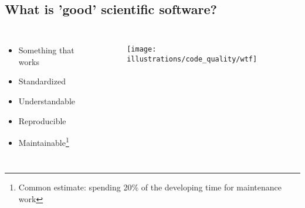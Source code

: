 \documentclass[usenames,dvipsnames]{beamer}
\theoremstyle{plain}
\theoremstyle{definition}
\begin{document}
\begin{frame}{\setframetitle{}}
{
        \begin{figure}
         {}
       \end{figure}
}
\end{frame}



\subsection{What is 'good' scientific software?}


\begin{frame}{\setframetitle{}}
  {
    \begin{columns}[t]
      \begin{itemize}
      \item Something that works

      \item Standardized
      \item Understandable
      \item Reproducible 
      \item
\renewcommand{\thefootnote}{\fnsymbol{footnote}}
Maintainable\footnote{Common estimate: spending 20\% of the developing time
        for maintenance work }
      \end{itemize}
 \begin{figure}
        \captionsetup[subfigure]{justification=centering}
        \centering
        \subcaptionbox{}
        {\texttt{[image: illustrations/code\_quality/wtf]}}
      \end{figure}
    \end{columns}
}

\end{frame}
\end{document}

